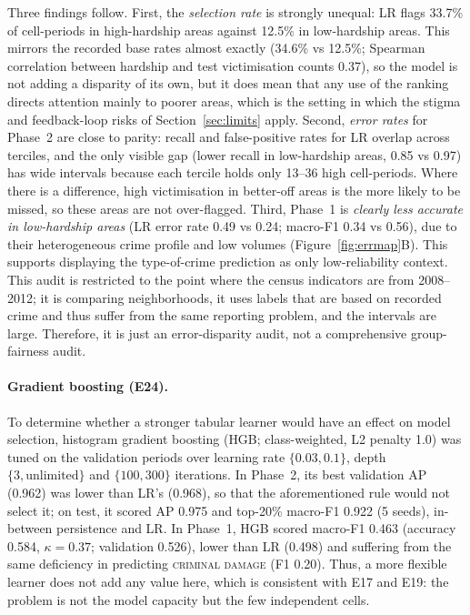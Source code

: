 \documentclass[11pt,a4paper]{report}
\begin{document}
Three findings follow. First, the \emph{selection rate} is strongly unequal: LR flags 33.7\% of cell-periods in high-hardship areas against 12.5\% in low-hardship areas. This mirrors the recorded base rates almost exactly (34.6\% vs 12.5\%; Spearman correlation between hardship and test victimisation counts 0.37), so the model is not adding a disparity of its own, but it does mean that any use of the ranking directs attention mainly to poorer areas, which is the setting in which the stigma and feedback-loop risks of Section~\ref{sec:limits} apply. Second, \emph{error rates} for Phase~2 are close to parity: recall and false-positive rates for LR overlap across terciles, and the only visible gap (lower recall in low-hardship areas, 0.85 vs 0.97) has wide intervals because each tercile holds only 13--36 high cell-periods. Where there is a difference, high victimisation in better-off areas is the more likely to be missed, so these areas are not over-flagged. Third, Phase~1 is \emph{clearly less accurate in low-hardship areas} (LR error rate 0.49 vs 0.24; macro-F1 0.34 vs 0.56), due to their heterogeneous crime profile and low volumes (Figure~\ref{fig:errmap}B). This supports displaying the type-of-crime prediction as only low-reliability context. This audit is restricted to the point where the census indicators are from 2008--2012; it is comparing neighborhoods, it uses labels that are based on recorded crime and thus suffer from the same reporting problem, and the intervals are large. Therefore, it is just an error-disparity audit, not a comprehensive group-fairness audit.

\paragraph{Gradient boosting (E24).} To determine whether a stronger tabular learner would have an effect on model selection, histogram gradient boosting (HGB; class-weighted, L2 penalty 1.0) was tuned on the validation periods over learning rate $\{0.03, 0.1\}$, depth $\{3, \text{unlimited}\}$ and $\{100, 300\}$ iterations. In Phase~2, its best validation AP (0.962) was lower than LR's (0.968), so that the aforementioned rule would not select it; on test, it scored AP 0.975 and top-20\% macro-F1 0.922 (5 seeds), in-between persistence and LR. In Phase~1, HGB scored macro-F1 0.463 (accuracy 0.584, $\kappa=0.37$; validation 0.526), lower than LR (0.498) and suffering from the same deficiency in predicting \textsc{criminal damage} (F1 0.20). Thus, a more flexible learner does not add any value here, which is consistent with E17 and E19: the problem is not the model capacity but the few independent cells.
\end{document}
